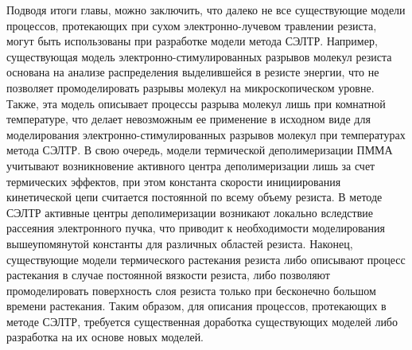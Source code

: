 \newpage
Подводя итоги главы, можно заключить, что далеко не все существующие модели процессов, протекающих при сухом электронно-лучевом травлении резиста, могут быть использованы при разработке модели метода СЭЛТР.
Например, существующая модель электронно-стимулированных разрывов молекул резиста основана на анализе распределения выделившейся в резисте энергии, что не позволяет промоделировать разрывы молекул на микроскопическом уровне.
Также, эта модель описывает процессы разрыва молекул лишь при комнатной температуре, что делает невозможным ее применение в исходном виде для моделирования электронно-стимулированных разрывов молекул при температурах метода СЭЛТР.
В свою очередь, модели термической деполимеризации ПММА учитывают возникновение активного центра деполимеризации лишь за счет термических эффектов, при этом константа скорости инициирования кинетической цепи считается постоянной по всему объему резиста.
В методе СЭЛТР активные центры деполимеризации возникают локально вследствие рассеяния электронного пучка, что приводит к необходимости моделирования вышеупомянутой константы для различных областей резиста.
Наконец, существующие модели термического растекания резиста либо описывают процесс растекания в случае постоянной вязкости резиста, либо позволяют промоделировать поверхность слоя резиста только при бесконечно большом времени растекания.
Таким образом, для описания процессов, протекающих в методе СЭЛТР, требуется существенная доработка существующих моделей либо разработка на их основе новых моделей.

